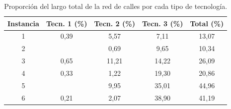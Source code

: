 \begin{table}[h!]
  \centering
  \begin{tabular}{ccccc}
    \toprule
      Instancia & Tecn. 1 (\%) & Tecn. 2 (\%) & Tecn. 3 (\%) & Total (\%) \\
    \midrule
      1 & 0,39 & 5,57 & 7,11 & 13,07 \\
      2 &      & 0,69 & 9,65 & 10,34 \\
      3 & 0,65 & 11,21 & 14,22 & 26,09 \\
      4 & 0,33 & 1,22 & 19,30 & 20,86 \\
      5 &      & 9,95 & 35,01 & 44,96 \\
      6 & 0,21 & 2,07 & 38,90 & 41,19 \\
    \bottomrule
  \end{tabular}
  \caption{Proporción del largo total de la red de calles por cada tipo de tecnología.}
  \label{table:montevideoinfracoverage}
\end{table}

